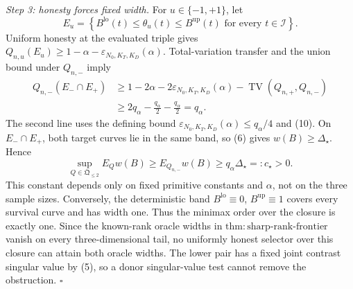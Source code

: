 \emph{Step 3: honesty forces fixed width.}
For \(u\in\{-1,+1\}\), let
\[
E_u=\left\{B^{\mathrm{lo}}(t)\leq\theta_u(t)\leq
B^{\mathrm{up}}(t)\text{ for every }t\in\mathcal I\right\}.
\]
Uniform honesty at the evaluated triple gives
\(Q_{n,u}(E_u)\geq1-\alpha-\varepsilon_{N_0,K_T,K_D}(\alpha)\).
Total-variation transfer and the union bound under \(Q_{n,-}\) imply
\[
\begin{aligned}
Q_{n,-}(E_-\cap E_+)
&\geq1-2\alpha-2\varepsilon_{N_0,K_T,K_D}(\alpha)
-\operatorname{TV}(Q_{n,+},Q_{n,-})\\
&\geq 2q_\alpha-\frac{q_\alpha}{2}-\frac{q_\alpha}{2}
=q_\alpha.
\end{aligned}
\tag{11}
\]
The second line uses the defining bound
\(\varepsilon_{N_0,K_T,K_D}(\alpha)\leq q_\alpha/4\) and (10).  On
\(E_-\cap E_+\), both target curves lie in the same band, so (6) gives
\(w(B)\geq\Delta_\star\).  Hence
\[
\sup_{Q\in\mathfrak Q_{\leq2}}E_Qw(B)
\geq E_{Q_{n,-}}w(B)
\geq q_\alpha\Delta_\star=:c_\star>0.
\tag{12}
\]
This constant depends only on fixed primitive constants and \(\alpha\), not on the
three sample sizes.  Conversely, the deterministic band
\(B^{\mathrm{lo}}\equiv0\), \(B^{\mathrm{up}}\equiv1\) covers every survival curve
and has width one.  Thus the minimax order over the closure is exactly one.  Since
the known-rank oracle widths in \(\mathrm{thm:sharp\mbox{-}rank\mbox{-}frontier}\)
vanish on every three-dimensional tail, no uniformly honest selector over this
closure can attain both oracle widths.  The lower pair has a fixed joint contrast
singular value by (5), so a donor singular-value test cannot remove the obstruction.
\(\square\)